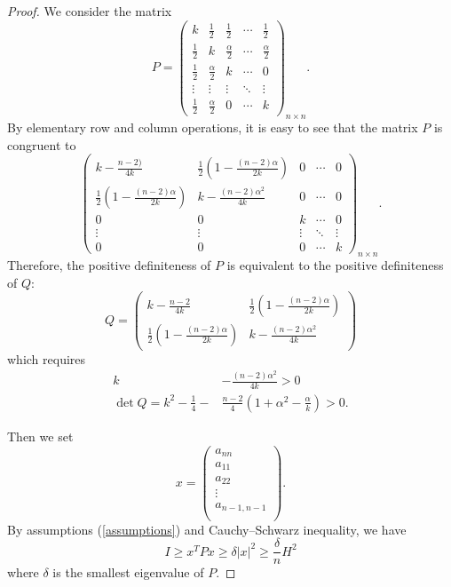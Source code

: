 \documentclass[11pt,letterpaper]{amsart}
\theoremstyle{definition}
\theoremstyle{remark}
\numberwithin{equation}{section}
\begin{document}
\begin{proof}
We consider the matrix
\begin{equation}\label{matrix_A} 
P=\begin{pmatrix} k & \frac{1}{2} & \frac{1}{2} & \cdots & \frac{1}{2} \\ \frac{1}{2} & k & \frac{\alpha}{2} & \cdots & \frac{\alpha}{2} \\ \frac{1}{2} & \frac{\alpha}{2} & k &\cdots & 0\\ \vdots & \vdots & \vdots & \ddots & \vdots\\ \frac{1}{2} & \frac{\alpha}{2} & 0 & \cdots & k \end{pmatrix}_{n\times n}.   
\end{equation} 
By elementary row and column operations, it is easy to see that the matrix $P$ is congruent to 
\begin{equation*}
    \begin{pmatrix}
         k-\frac{n-2)}{4k} & \frac{1}{2}\left(1-\frac{(n-2)\alpha}{2k}\right) & 0 & \cdots & 0 \\ \frac{1}{2}\left(1-\frac{(n-2)\alpha}{2k}\right)  & k-\frac{(n-2)\alpha^2}{4k} & 0 & \cdots & 0 \\ 0 & 0 & k &\cdots & 0\\ \vdots & \vdots & \vdots & \ddots & \vdots\\ 0 & 0 & 0 & \cdots & k
    \end{pmatrix}_{n\times n}.
\end{equation*}
Therefore, the positive definiteness of $P$ is equivalent to the positive definiteness of $Q$:
\begin{equation*}
    Q=\begin{pmatrix}
        k-\frac{n-2}{4k} & \frac{1}{2}\left(1-\frac{(n-2)\alpha}{2k}\right)  \\ \frac{1}{2}\left(1-\frac{(n-2)\alpha}{2k}\right)  & k-\frac{(n-2)\alpha^2}{4k}
    \end{pmatrix}
\end{equation*}
which requires 
\begin{equation}\label{two-eigenvalues}
    \begin{split}
       k&-\frac{(n-2)\alpha^2}{4k}>0\\
        \det Q=k^2-\frac{1}{4}-&\frac{n-2}{4}\left(1+\alpha^2-\frac{\alpha}{k}\right)>0.
    \end{split}
\end{equation}


Then we set \[x=\begin{pmatrix}a_{nn}\\ a_{11}\\ a_{22}\\ \vdots\\ a_{n-1,n-1}\\ \end{pmatrix}.\] By assumptions (\ref{assumptions}) and Cauchy--Schwarz inequality, we have \[I\geq x^TPx\geq \delta |x|^2\geq \frac{\delta}{n}H^2\] where $\delta$ is the smallest eigenvalue of $P$.

\end{proof}
\end{document}
